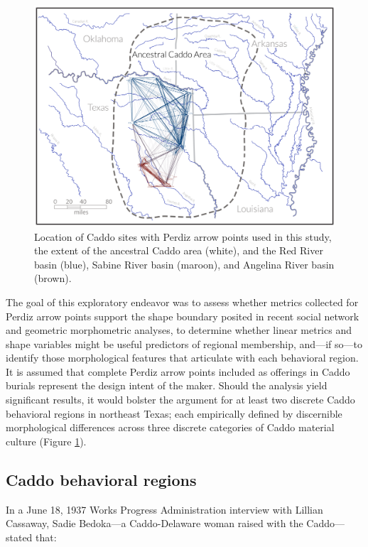 \documentclass[smallextended]{svjour3}       %
\begin{document}
\begin{figure}
\includegraphics[width=1\linewidth]{ms-figs/figure1} \caption{Location of Caddo sites with Perdiz arrow points used in this study, the extent of the ancestral Caddo area (white), and the Red River basin (blue), Sabine River basin (maroon), and Angelina River basin (brown).}\label{fig:fig1}
\end{figure}

The goal of this exploratory endeavor was to assess whether metrics
collected for Perdiz arrow points support the shape boundary posited in
recent social network and geometric morphometric analyses, to determine
whether linear metrics and shape variables might be useful predictors of
regional membership, and---if so---to identify those morphological
features that articulate with each behavioral region. It is assumed that
complete Perdiz arrow points included as offerings in Caddo burials
represent the design intent of the maker. Should the analysis yield
significant results, it would bolster the argument for at least two
discrete Caddo behavioral regions in northeast Texas; each empirically
defined by discernible morphological differences across three discrete
categories of Caddo material culture (Figure \ref{fig:fig1}).

\hypertarget{caddo-behavioral-regions}{%
\subsection{Caddo behavioral regions}\label{caddo-behavioral-regions}}

In a June 18, 1937 Works Progress Administration interview with Lillian
Cassaway, Sadie Bedoka---a Caddo-Delaware woman raised with the
Caddo---stated that:
\end{document}
